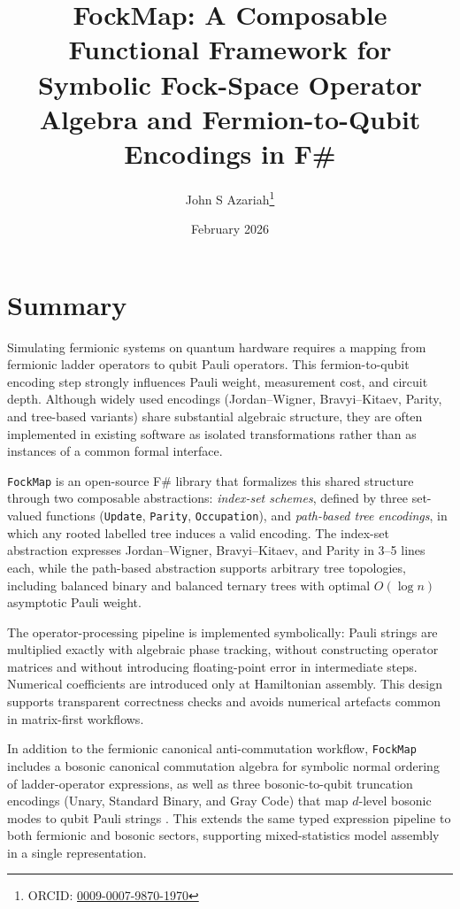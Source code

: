 \documentclass[10pt,a4paper]{article}
\title{FockMap: A Composable Functional Framework for\\
  Symbolic Fock-Space Operator Algebra and Fermion-to-Qubit Encodings in F\#}
\author[1]{John S Azariah\thanks{ORCID: \href{https://orcid.org/0009-0007-9870-1970}{0009-0007-9870-1970}}}
\affil[1]{Centre for Quantum Software and Information,
  School of Computer Science,
  Faculty of Engineering \& Information Technology,
  University of Technology Sydney, NSW 2007, Australia}
\date{February 2026}
\begin{document}
\maketitle

\section*{Summary}

Simulating fermionic systems on quantum hardware requires a mapping
from fermionic ladder operators to qubit Pauli operators.  This
fermion-to-qubit encoding step strongly influences Pauli weight,
measurement cost, and circuit depth.  Although widely used encodings
(Jordan--Wigner, Bravyi--Kitaev, Parity, and tree-based variants) share
substantial algebraic structure, they are often implemented in existing
software as isolated transformations rather than as instances of a
common formal interface.

\texttt{FockMap} is an open-source F\# library that formalizes this
shared structure through two composable abstractions: \emph{index-set
schemes}, defined by three set-valued functions (\texttt{Update},
\texttt{Parity}, \texttt{Occupation}), and \emph{path-based tree
encodings}, in which any rooted labelled tree induces a valid
encoding.  The index-set abstraction expresses Jordan--Wigner,
Bravyi--Kitaev, and Parity in 3--5 lines each, while the path-based
abstraction supports arbitrary tree topologies, including balanced
binary and balanced ternary trees with optimal $O(\log n)$ asymptotic
Pauli weight.

The operator-processing pipeline is implemented symbolically: Pauli
strings are multiplied exactly with algebraic phase tracking, without
constructing operator matrices and without introducing floating-point
error in intermediate steps.  Numerical coefficients are introduced only
at Hamiltonian assembly.  This design supports transparent correctness
checks and avoids numerical artefacts common in matrix-first workflows.

In addition to the fermionic canonical anti-commutation workflow,
\texttt{FockMap} includes a bosonic canonical commutation algebra
for symbolic normal ordering of ladder-operator expressions, as well
as three bosonic-to-qubit truncation encodings (Unary, Standard Binary,
and Gray Code) that map $d$-level bosonic modes to qubit Pauli strings
\citep{sawaya2020}.  This extends the same typed expression pipeline
to both fermionic and bosonic sectors, supporting mixed-statistics
model assembly in a single representation.
\end{document}
